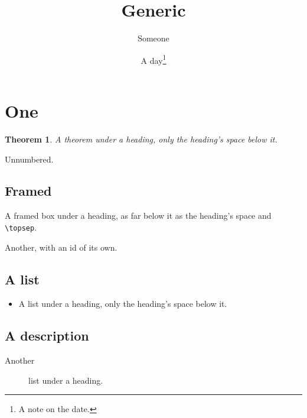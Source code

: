 \documentclass{article}
\title{\Large Generic}
\author{Someone}
\date{A day\thanks{A note on the date.}}
\numberwithin{equation}{section}
\newtheorem{thm}{Theorem}
\begin{document}
\maketitle
\tableofcontents
\section{One}
\begin{thm}
    A theorem under a heading, only the heading's space below it.
\end{thm}
Unnumbered.
\subsection*{Framed}
\begin{framed}
    A framed box under a heading, as far below it as the heading's space and \verb|\topsep|.
\end{framed}
\begin{framed}
    Another, with an id of its own.
\end{framed}
\subsection*{A list}
\begin{itemize}
    \item A list under a heading, only the heading's space below it.
\end{itemize}
\subsection*{A description}
\begin{description}
    \item[Another] list under a heading.
\end{description}
\end{document}
